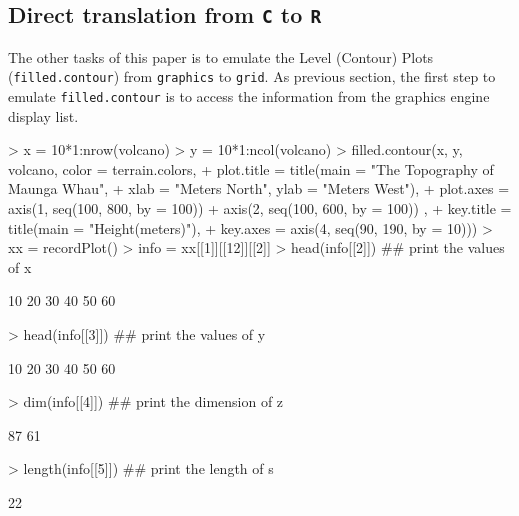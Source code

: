 \documentclass[paper=a4, fontsize=11pt]{report}
\begin{document}
\subsection{Direct translation from \texttt{C} to \texttt{R}}
The other tasks of this paper is to emulate the Level (Contour) Plots (\texttt{filled.contour}) from \texttt{graphics} to \texttt{grid}. As previous section, the first step to emulate \texttt{filled.contour} is to access the information from the graphics engine display list.
\begin{Schunk}
\begin{Sinput}
> x = 10*1:nrow(volcano)
> y = 10*1:ncol(volcano)
> filled.contour(x, y, volcano, color = terrain.colors,
+     plot.title = title(main = "The Topography of Maunga Whau",
+     xlab = "Meters North", ylab = "Meters West"),
+     plot.axes = { axis(1, seq(100, 800, by = 100))
+                   axis(2, seq(100, 600, by = 100)) },
+     key.title = title(main = "Height\n(meters)"),
+     key.axes = axis(4, seq(90, 190, by = 10)))
> xx = recordPlot()
> info = xx[[1]][[12]][[2]]
> head(info[[2]])  ## print the values of x
\end{Sinput}
\begin{Soutput}
[1] 10 20 30 40 50 60
\end{Soutput}
\begin{Sinput}
> head(info[[3]])  ## print the values of y
\end{Sinput}
\begin{Soutput}
[1] 10 20 30 40 50 60
\end{Soutput}
\begin{Sinput}
> dim(info[[4]])  ## print the dimension of z
\end{Sinput}
\begin{Soutput}
[1] 87 61
\end{Soutput}
\begin{Sinput}
> length(info[[5]])  ## print the length of s
\end{Sinput}
\begin{Soutput}
[1] 22
\end{Soutput}
\end{Schunk}
\end{document}
